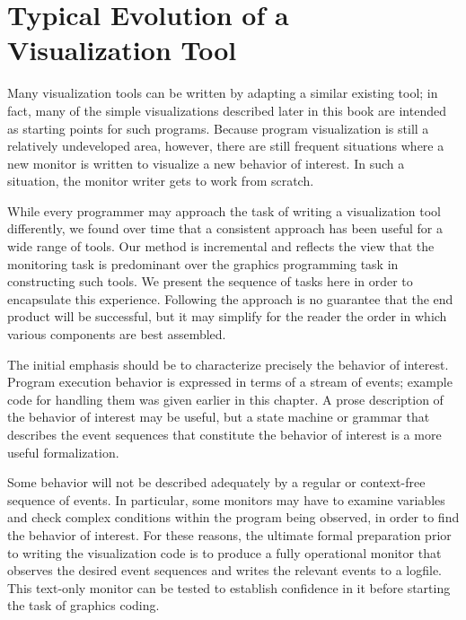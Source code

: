 \section{Typical Evolution of a Visualization Tool}

Many visualization tools can be written by adapting a similar existing tool;
in fact, many of the simple visualizations described later in this book are
intended as starting points for such programs.  Because program
visualization is still a relatively undeveloped area, however, there are
still frequent situations where a new monitor is written to visualize a new
behavior of interest.  In such a situation, the monitor writer gets to work
from scratch.

While every programmer may approach the task of writing a visualization tool
differently, we found over time that a consistent approach has been useful
for a wide range of tools.  Our method is incremental and reflects the view
that the monitoring task is predominant over the graphics programming task
in constructing such tools.  We present the sequence of tasks here in order
to encapsulate this experience.  Following the approach is no guarantee that
the end product will be successful, but it may simplify for the reader the
order in which various components are best assembled.

\vspace{1pc}

\nopagebreak

\vspace{0.25pc}
\noindent
{}
The initial emphasis should be to characterize precisely the behavior of
interest.  Program execution behavior is expressed in terms of a stream of
events; example code for handling them
was given earlier in this chapter.  A prose description of the behavior of
interest may be useful, but a state machine or grammar that describes the
event sequences that constitute the behavior of interest is a more useful
formalization.

Some behavior will not be described adequately by a regular or context-free
sequence of events.  In particular, some monitors may have to examine
variables and check complex conditions within the program being observed, in
order to find the behavior of interest.  For these reasons, the ultimate
formal preparation prior to writing the visualization code is to produce a
fully operational monitor that observes the desired event sequences and
writes the relevant events to a logfile.  This text-only monitor can be tested
to establish confidence in it before starting the task of graphics coding.

